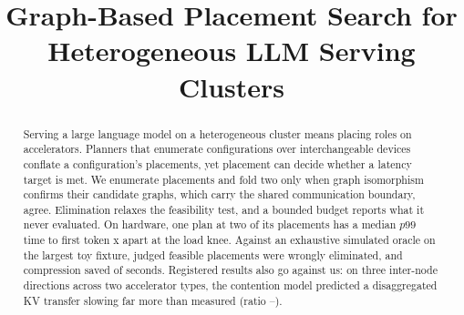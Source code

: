 \documentclass[conference,10pt]{IEEEtran}
\begin{document}
\title{Graph-Based Placement Search for Heterogeneous LLM Serving Clusters}

\author{}

\maketitle
\thispagestyle{plain}
\pagestyle{plain}

\begin{abstract}
Serving a large language model on a heterogeneous cluster means placing roles
on accelerators. Planners that enumerate configurations over interchangeable
devices conflate a configuration's placements, yet placement can decide whether
a latency target is met. We enumerate placements
and fold two only when graph isomorphism confirms their candidate graphs,
which carry the shared communication boundary, agree. Elimination
relaxes the feasibility test, and a bounded budget reports what it never
evaluated. On hardware, one plan at two of its placements has a median $p99$
time to first token \egfiveTtwoOverTone{}x apart at the load knee. Against an
exhaustive simulated oracle on the largest toy fixture, \egthreeFalseInfAbcde{}
judged feasible placements were wrongly eliminated, and compression
saved \egthreeSavingAbcde{} of \egthreeSimOracleAbcde{} seconds. Registered
results also go against us: on three inter-node directions across two
accelerator types, the contention model predicted a disaggregated KV transfer
slowing far more than measured (ratio \egeightRatioLo{}--\egeightRatioHi{}).
\end{abstract}












\end{document}
